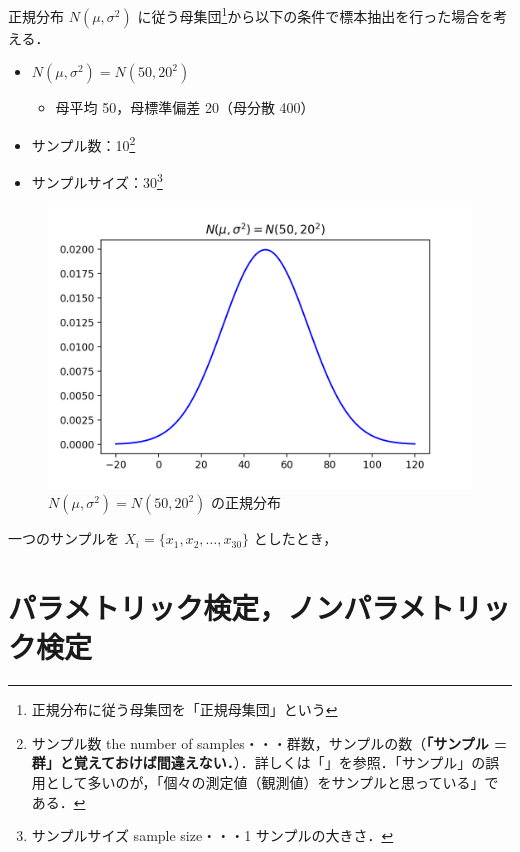正規分布 $N(\mu, \sigma^2)$ に従う母集団\footnote{正規分布に従う母集団を「正規母集団」という}から以下の条件で標本抽出を行った場合を考える．

\begin{itemize}
  \item $N(\mu, \sigma^2) = N(50, 20^2)$
        \begin{itemize}
          \item 母平均 50，母標準偏差 20（母分散 400）
        \end{itemize}
  \item サンプル数：10\footnote{サンプル数 the number of samples・・・群数，サンプルの数（\textbf{「サンプル = 群」と覚えておけば間違えない．}）．詳しくは「」を参照．「サンプル」の誤用として多いのが，「個々の測定値（観測値）をサンプルと思っている」である．}
  \item サンプルサイズ：30\footnote{サンプルサイズ sample size・・・1 サンプルの大きさ．}
\end{itemize}

\begin{figure}[H]
  \begin{center}
    \includegraphics[width=15cm]{images/parts/3/norm-dist.png}
    \caption{$N(\mu, \sigma^2) = N(50, 20^2)$ の正規分布}
  \end{center}
\end{figure}

一つのサンプルを $X_i = \{x_1, x_2, \ldots, x_{30}\}$ としたとき，

\section{パラメトリック検定，ノンパラメトリック検定}
